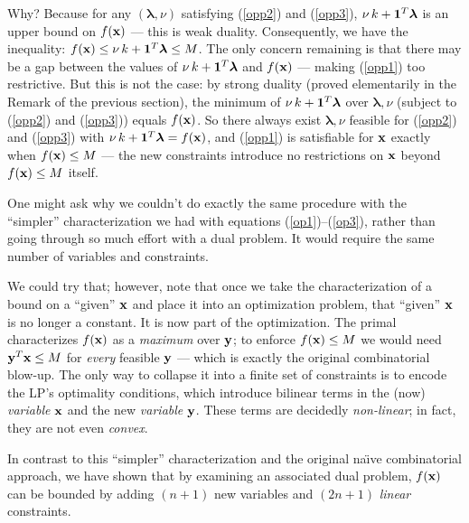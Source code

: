 \documentclass[12pt]{article}
\begin{document}
Why? Because for any $({\boldsymbol \lambda}, \nu)$ satisfying (\ref{opp2}) and (\ref{opp3}),
$\nu \, k + {\bf 1}^T {\boldsymbol \lambda}$ is an upper bound on $f({\bf x})$ --- this is weak duality.
Consequently, we have the inequality: 
$f({\bf x}) \le \nu \, k + {\bf 1}^T {\boldsymbol \lambda} \le M$.
The only concern remaining is that there may be a gap between the values of 
$\nu \, k + {\bf 1}^T {\boldsymbol \lambda}$ 
and $f({\bf x})$ --- making (\ref{opp1}) too restrictive. 
But this is not the case: by strong duality (proved elementarily in the
Remark of the previous section), the minimum of
$\nu \, k + {\bf 1}^T {\boldsymbol \lambda}$ over ${\boldsymbol \lambda}, \nu$
(subject to (\ref{opp2}) and (\ref{opp3})) equals $f({\bf x})$.
So there always exist ${\boldsymbol \lambda}, \nu$ feasible for (\ref{opp2}) and (\ref{opp3})
with $\nu \, k + {\bf 1}^T {\boldsymbol \lambda} = f({\bf x})$, and (\ref{opp1}) is satisfiable
for ${\bf x}$ exactly when $f({\bf x}) \le M$ --- the new constraints introduce no
restrictions on ${\bf x}$ beyond $f({\bf x}) \le M$ itself.

One might ask why we couldn't do exactly the same procedure with the ``simpler''
characterization we had with equations
(\ref{op1})--(\ref{op3}), rather than going through so much
effort with a dual problem. It would require the same number of variables and constraints.

We could try that; however, note that once we take the characterization of a
bound on a ``given'' ${\bf x}$ and place it into an optimization problem, that
``given'' ${\bf x}$ is no longer a constant. It is now part of the
optimization. The primal characterizes $f({\bf x})$ as a {\it maximum\/} over ${\bf y}$;
to enforce $f({\bf x}) \le M$ we would need ${\bf y}^T {\bf x} \le M$ for {\it every\/}
feasible ${\bf y}$ --- which is exactly the original combinatorial blow-up. The only way
to collapse it into a finite set of constraints is to encode the LP's optimality
conditions, which introduce bilinear terms in the (now) {\it variable\/} ${\bf x}$
and the new {\it variable\/} ${\bf y}$. These terms are decidedly {\it non-linear\/};
in fact, they are not even {\it convex\/}.

In contrast to this ``simpler'' characterization and the original na\"\i ve
combinatorial approach, we have shown that
by examining an associated dual problem, $f({\bf x})$ can be bounded by
adding $(n+1)$ new variables and $(2n + 1)$ {\it linear\/} constraints.
\end{document}
